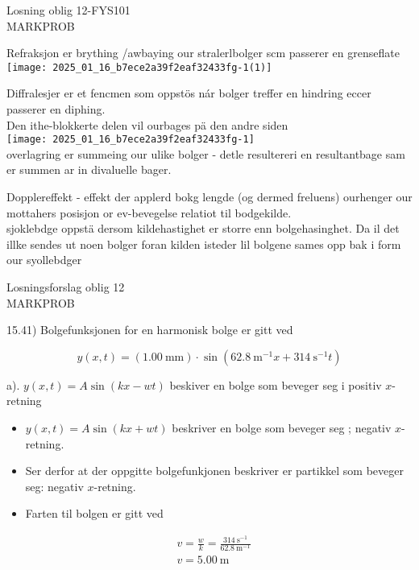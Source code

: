 \documentclass[10pt]{article}
\begin{document}
Losning oblig 12-FYS101\\

MARKPROB

Refraksjon er brything /awbaying our stralerlbolger scm passerer en grenseflate\\
\texttt{[image: 2025\_01\_16\_b7ece2a39f2eaf32433fg-1(1)]}

Diffralesjer er et fencmen som oppstös nár bolger treffer en hindring eccer passerer en diphing.\\
Den ithe-blokkerte delen vil ourbages pä den andre siden\\
\texttt{[image: 2025\_01\_16\_b7ece2a39f2eaf32433fg-1]}\\
overlagring er summeing our ulike bolger - detle resultereri en resultantbage sam er summen ar in divaluelle bager.

Dopplereffekt - effekt der applerd bokg lengde (og dermed freluens) ourhenger our mottahers posisjon or ev-bevegelse relatiot til bodgekilde.\\
sjoklebdge oppstä dersom kildehastighet er storre enn bolgehasinghet. Da il det illke sendes ut noen bolger foran kilden isteder lil bolgene sames opp bak i form our syollebdger

Losningsforslag oblig 12\\

MARKPROB

15.41) Bolgefunksjonen for en harmonisk bolge er gitt ved

$$
y(x, t)=(1.00 \mathrm{~mm}) \cdot \sin \left(62.8 \mathrm{~m}^{-1} x+314 \mathrm{~s}^{-1} t\right)
$$

a). $y(x, t)=A \sin (k x-w t)$ beskiver en bolge som beveger seg i positiv $x$-retning

\begin{itemize}
  \item $y(x, t)=A \sin (k x+w t)$ beskriver en bolge som beveger seg ; negativ $x$-retning.
  \item Ser derfor at der oppgitte bolgefunkjonen beskriver er partikkel som beveger seg: negativ $x$-retning.
  \item Farten til bolgen er gitt ved
\end{itemize}

$$
\begin{aligned}
& v=\frac{w}{k}=\frac{314 \mathrm{~s}^{-1}}{62.8 \mathrm{~m}^{-1}} \\
& v=5.00 \mathrm{~m}
\end{aligned}
$$
\end{document}
